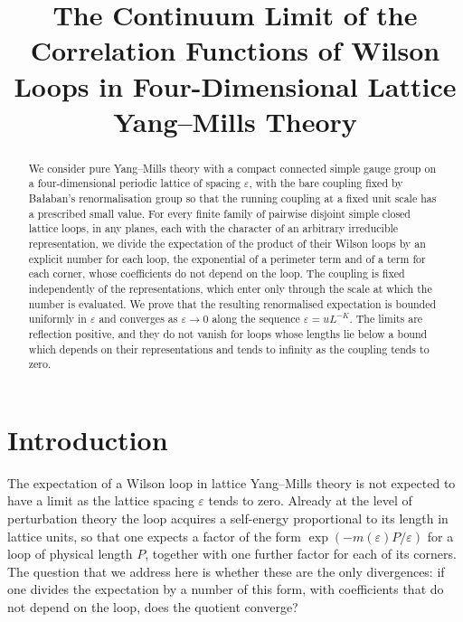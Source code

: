 \documentclass[11pt]{preprint}
\title{The Continuum Limit of the Correlation Functions of Wilson Loops in Four-Dimensional Lattice Yang--Mills Theory}
\author{}
\date{}
\numberwithin{equation}{section}
\theoremstyle{definition}
\theoremstyle{remark}
\theoremstyle{plain}
\begin{document}
\maketitle

\begin{abstract}
We consider pure Yang--Mills theory with a compact connected simple gauge group on a four-dimensional periodic lattice of spacing $\varepsilon$, with the bare coupling fixed by Ba{\l}aban's renormalisation group so that the running coupling at a fixed unit scale has a prescribed small value. For every finite family of pairwise disjoint simple closed lattice loops, in any planes, each with the character of an arbitrary irreducible representation, we divide the expectation of the product of their Wilson loops by an explicit number for each loop, the exponential of a perimeter term and of a term for each corner, whose coefficients do not depend on the loop. The coupling is fixed independently of the representations, which enter only through the scale at which the number is evaluated. We prove that the resulting renormalised expectation is bounded uniformly in $\varepsilon$ and converges as $\varepsilon \to 0$ along the sequence $\varepsilon = uL^{-K}$. The limits are reflection positive, and they do not vanish for loops whose lengths lie below a bound which depends on their representations and tends to infinity as the coupling tends to zero.
\end{abstract}

\setcounter{tocdepth}{2}
{\setlength{\parskip}{0pt}\tableofcontents}

\section{Introduction}\label{sec:introduction}

The expectation of a Wilson loop in lattice Yang--Mills theory is not expected to have a limit as the lattice spacing $\varepsilon$ tends to zero. Already at the level of perturbation theory the loop acquires a self-energy proportional to its length in lattice units, so that one expects a factor of the form $\exp(-m(\varepsilon)P/\varepsilon)$ for a loop of physical length $P$, together with one further factor for each of its corners. The question that we address here is whether these are the only divergences: if one divides the expectation by a number of this form, with coefficients that do not depend on the loop, does the quotient converge?
\end{document}
